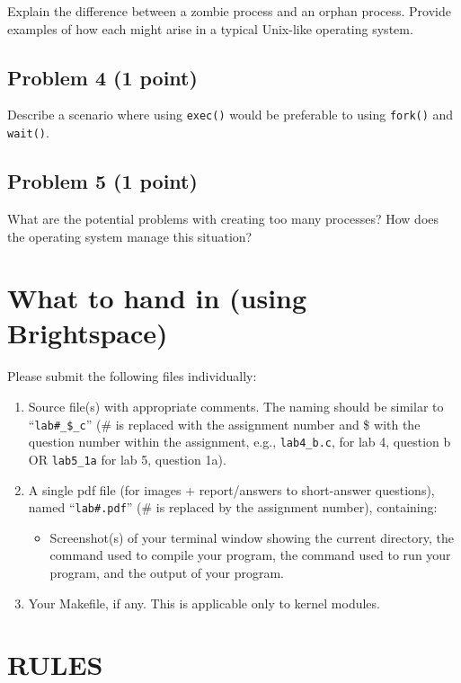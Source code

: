 \documentclass{article}
\begin{document}
Explain the difference between a zombie process and an orphan process. Provide examples of how each might arise in a typical Unix-like operating system.


\subsection*{Problem 4 (1 point)}

Describe a scenario where using \texttt{exec()} would be preferable to using \texttt{fork()} and \texttt{wait()}.


\subsection*{Problem 5 (1 point)}

What are the potential problems with creating too many processes? How does the operating system manage this situation?


\section*{What to hand in (using Brightspace)}

Please submit the following files individually:

\begin{enumerate}
    \item Source file(s) with appropriate comments. The naming should be similar to “\texttt{lab\#\_\$\_c}” (\# is replaced with the assignment number and \$ with the question number within the assignment, e.g., \texttt{lab4\_b.c}, for lab 4, question b OR \texttt{lab5\_1a} for lab 5, question 1a).
    \item A single pdf file (for images + report/answers to short-answer questions), named “\texttt{lab\#.pdf}” (\# is replaced by the assignment number), containing:
    \begin{itemize}
        \item Screenshot(s) of your terminal window showing the current directory, the command used to compile your program, the command used to run your program, and the output of your program.
    \end{itemize}
    \item Your Makefile, if any. This is applicable only to kernel modules.
\end{enumerate}

\section*{RULES}
\end{document}
